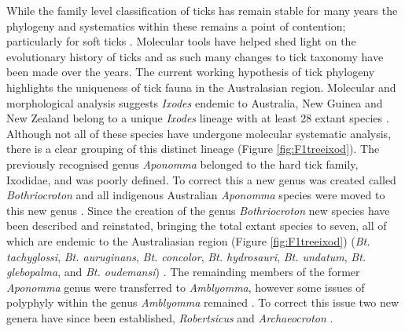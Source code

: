 \documentclass[a4paper, nobind]{templates/ociamthesis}
\begin{document}
While the family level classification of ticks has remain stable for many years the phylogeny and systematics within these remains a point of contention; particularly for soft ticks \autocite{mansArgasidIxodidSystematics2019}.
Molecular tools have helped shed light on the evolutionary history of ticks and as such many changes to tick taxonomy have been made over the years.
The current working hypothesis of tick phylogeny highlights the uniqueness of tick fauna in the Australasian region.
Molecular and morphological analysis suggests \emph{Ixodes} endemic to Australia, New Guinea and New Zealand belong to a unique \emph{Ixodes} lineage with at least 28 extant species \autocite{barkerSystematicsEvolutionTicks2004}.
Although not all of these species have undergone molecular systematic analysis, there is a clear grouping of this distinct lineage (Figure \ref{fig:F1treeixod}).
The previously recognised genus \emph{Aponomma} belonged to the hard tick family, Ixodidae, and was poorly defined.
To correct this a new genus was created called \emph{Bothriocroton} and all indigenous Australian \emph{Aponomma} species were moved to this new genus \autocite{keiransAponommaBothriocrotonGlebopalma1994,klompenNewSubfamilyBothriocrotoninae2002}.
Since the creation of the genus \emph{Bothriocroton} new species have been described and reinstated, bringing the total extant species to seven, all of which are endemic to the Australiasian region (Figure \ref{fig:F1treeixod}) (\emph{Bt. tachyglossi}, \emph{Bt. auruginans}, \emph{Bt. concolor}, \emph{Bt. hydrosauri}, \emph{Bt. undatum}, \emph{Bt. glebopalma}, and \emph{Bt. oudemansi}) \autocite{keiransAponommaBothriocrotonGlebopalma1994,klompenNewSubfamilyBothriocrotoninae2002,andrewsSystematicStatusAponomma2006,beatiBothriocrotonOudemansiNeumann2008}.
The remainding members of the former \emph{Aponomma} genus were transferred to \emph{Amblyomma}, however some issues of polyphyly within the genus \emph{Amblyomma} remained \autocite{burgerPhylogeneticAnalysisTicks2012,burgerPhylogeneticAnalysisMitochondrial2013}.
To correct this issue two new genera have since been established, \emph{Robertsicus} and \emph{Archaeocroton} \autocite{barkerTwoNewGenera2018}.
\end{document}
